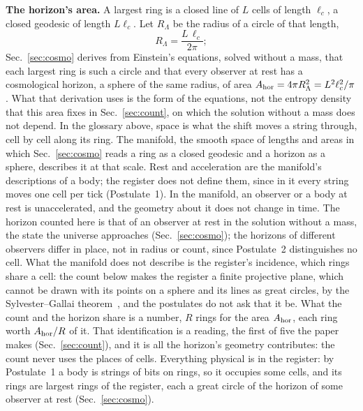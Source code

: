 \documentclass[aps,prd,twocolumn,superscriptaddress,nofootinbib,showkeys]{revtex4-2}
\newcommand{\lc}{\ell_c}
\newcommand{\RL}{R_\Lambda}
\begin{document}
\textbf{The horizon's area.} A largest ring is a closed line of $L$ cells of length $\lc$, a closed geodesic of length $L\lc$. Let $\RL$ be the radius of a circle of that length,
\begin{equation}
\RL = \frac{L\,\lc}{2\pi} ;
\label{eq:ident}
\end{equation}
Sec.~\ref{sec:cosmo} derives from Einstein's equations, solved without a mass, that each largest ring is such a circle and that every observer at rest has a cosmological horizon, a sphere of the same radius, of area $A_{\rm hor} = 4\pi\RL^2 = L^2\lc^2/\pi$. What that derivation uses is the form of the equations, not the entropy density that this area fixes in Sec.~\ref{sec:count}, on which the solution without a mass does not depend. In the glossary above, space is what the shift moves a string through, cell by cell along its ring. The manifold, the smooth space of lengths and areas in which Sec.~\ref{sec:cosmo} reads a ring as a closed geodesic and a horizon as a sphere, describes it at that scale. Rest and acceleration are the manifold's descriptions of a body; the register does not define them, since in it every string moves one cell per tick (Postulate~1). In the manifold, an observer or a body at rest is unaccelerated, and the geometry about it does not change in time. The horizon counted here is that of an observer at rest in the solution without a mass, the state the universe approaches (Sec.~\ref{sec:cosmo}); the horizons of different observers differ in place, not in radius or count, since Postulate~2 distinguishes no cell. What the manifold does not describe is the register's incidence, which rings share a cell: the count below makes the register a finite projective plane, which cannot be drawn with its points on a sphere and its lines as great circles, by the Sylvester--Gallai theorem~\cite{erdos1943}, and the postulates do not ask that it be. What the count and the horizon share is a number, $R$ rings for the area $A_{\rm hor}$, each ring worth $A_{\rm hor}/R$ of it. That identification is a reading, the first of five the paper makes (Sec.~\ref{sec:count}), and it is all the horizon's geometry contributes: the count never uses the places of cells. Everything physical is in the register: by Postulate~1 a body is strings of bits on rings, so it occupies some cells, and its rings are largest rings of the register, each a great circle of the horizon of some observer at rest (Sec.~\ref{sec:cosmo}).
\end{document}
